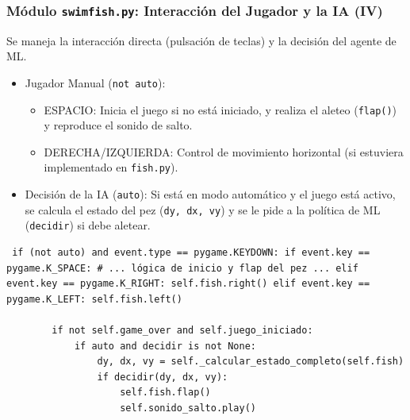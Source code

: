 \documentclass[
	11pt, %
]{beamer}
\begin{document}
\begin{frame}[fragile] \frametitle{Módulo \texttt{swimfish.py}: Interacción del Jugador y la IA (IV)}

Se maneja la interacción directa (pulsación de teclas) y la decisión del agente de ML.

\begin{itemize} \item Jugador Manual (\texttt{not auto}): \begin{itemize} \item ESPACIO: Inicia el juego si no está iniciado, y realiza el aleteo (\texttt{flap()}) y reproduce el sonido de salto. \item DERECHA/IZQUIERDA: Control de movimiento horizontal (si estuviera implementado en \texttt{fish.py}). \end{itemize} \item Decisión de la IA (\texttt{auto}): Si está en modo automático y el juego está activo, se calcula el estado del pez (\texttt{dy, dx, vy}) y se le pide a la política de ML (\texttt{decidir}) si debe aletear. \end{itemize}

\vspace{4pt} {\scriptsize \begin{verbatim} if (not auto) and event.type == pygame.KEYDOWN: if event.key == pygame.K_SPACE: # ... lógica de inicio y flap del pez ... elif event.key == pygame.K_RIGHT: self.fish.right() elif event.key == pygame.K_LEFT: self.fish.left()

        if not self.game_over and self.juego_iniciado:
            if auto and decidir is not None:
                dy, dx, vy = self._calcular_estado_completo(self.fish)
                if decidir(dy, dx, vy):
                    self.fish.flap()
                    self.sonido_salto.play()
\end{verbatim} } \end{frame}

\end{document}

